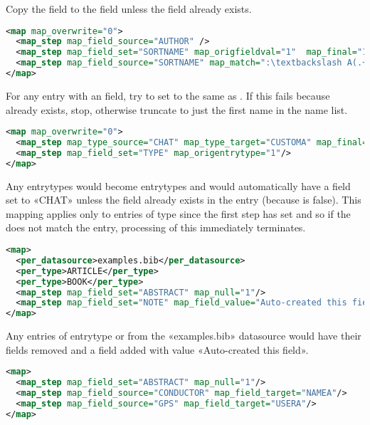 \documentclass{ltxdockit}
\begin{document}
\noindent Copy the  field to the  field unless the
 field already exists.

\begin{lstlisting}[language=xml,escapechar=:,mathescape=true]
<map map_overwrite="0">
  <map_step map_field_source="AUTHOR" />
  <map_step map_field_set="SORTNAME" map_origfieldval="1"  map_final="1"/>
  <map_step map_field_source="SORTNAME" map_match=":\textbackslash A(.+?)\textbackslash s+and.\ast" map\_replace="\$1:"/>
</map>
\end{lstlisting}

\noindent For any entry with an  field, try to set
 to the same as . If this fails because
 already exists, stop, otherwise truncate
 to just the first name in the name list.

\begin{lstlisting}[language=xml,escapechar=+,mathescape=true]
<map map_overwrite="0">
  <map_step map_type_source="CHAT" map_type_target="CUSTOMA" map_final="1"/>
  <map_step map_field_set="TYPE" map_origentrytype="1"/>
</map>
\end{lstlisting}

\noindent Any  entrytypes would become  entrytypes and 
would automatically have a  field set to 
«CHAT» unless the  field already exists in the entry (because
 is false). This mapping applies only to entries of type
 since the first step has  set and so if the
 does not match the entry, processing of this
 immediately terminates.

\begin{lstlisting}[language=xml,escapechar=+,mathescape=true]
<map>
  <per_datasource>examples.bib</per_datasource>
  <per_type>ARTICLE</per_type>
  <per_type>BOOK</per_type>
  <map_step map_field_set="ABSTRACT" map_null="1"/>
  <map_step map_field_set="NOTE" map_field_value="Auto-created this field"/>
</map>
\end{lstlisting}

\noindent Any entries of entrytype  or  from the
«examples.bib» datasource would have their 
fields removed and a  field added with value «Auto-created this field».

\begin{lstlisting}[language=xml,escapechar=:,mathescape=true]
<map>
  <map_step map_field_set="ABSTRACT" map_null="1"/>
  <map_step map_field_source="CONDUCTOR" map_field_target="NAMEA"/>
  <map_step map_field_source="GPS" map_field_target="USERA"/>
</map>
\end{lstlisting}
\end{document}
